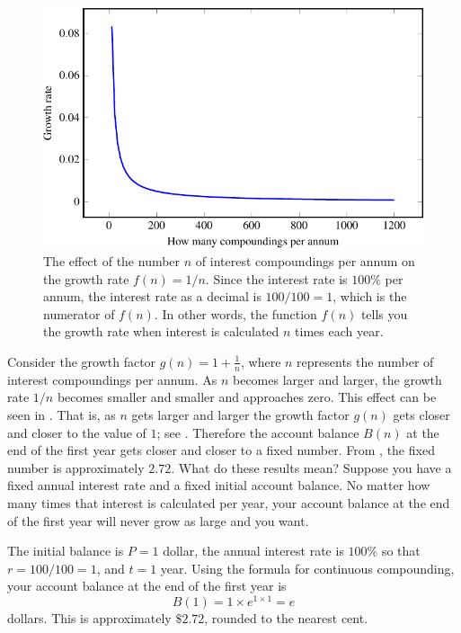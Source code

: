 \documentclass[a4paper,oneside,12pt]{article}
\begin{document}
\begin{problem}
{\begin{solution}
\begin{figure}[!htbp]
\centering
\includegraphics[scale=1.1]{image/11/e-1200-growth-rate.pdf}
\caption{%
  The effect of the number $n$ of interest compoundings per annum on
  the growth rate $f(n) = 1 / n$.  Since the interest rate is $100\%$
  per annum, the interest rate as a decimal is $100 / 100 = 1$, which
  is the numerator of $f(n)$.  In other words, the function $f(n)$
  tells you the growth rate when interest is calculated $n$ times each
  year.
}
\label{fig:exponential:e_saving_1200_growth_rate}
\end{figure}

Consider the growth factor $g(n) = 1 + \frac{1}{n}$, where $n$
represents the number of interest compoundings per annum.  As $n$
becomes larger and larger, the growth rate $1 / n$ becomes smaller and
smaller and approaches zero.  This effect can be seen in
.  That is, as $n$
gets larger and larger the growth factor $g(n)$ gets closer and closer
to the value of $1$; see
.  Therefore the account
balance $B(n)$ at the end of the first year gets closer and closer to
a fixed number.  From , the
fixed number is approximately $2.72$.  What do these results mean?
Suppose you have a fixed annual interest rate and a fixed initial
account balance.  No matter how many times that interest is calculated
per year, your account balance at the end of the first year will never
grow as large and you want.

The initial balance is $P = 1$ dollar, the annual interest rate is
$100\%$ so that $r = 100 / 100 = 1$, and $t = 1$ year.  Using the
formula for continuous compounding, your account balance at the end of
the first year is
\[
B(1)
=
1 \times e^{1 \times 1}
=
e
\]
dollars.  This is approximately $\$2.72$, rounded to the nearest
cent.
\end{solution}
}{}


\end{problem}
\end{document}
